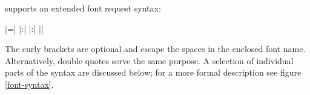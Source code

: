 \endsection


 supports an extended font request syntax:

\beginnarrower
			|\font\foo={|%
			|:|%
			|:|%
			|}|%
\endnarrower

\noindent
The curly brackets are optional and escape the spaces in the enclosed
font name.
%
Alternatively, double quotes serve the same purpose.
%
A selection of individual parts of the syntax are discussed below;
for a more formal description see figure \ref{font-syntax}.

